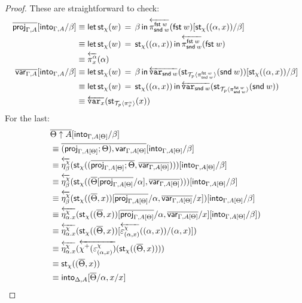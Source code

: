 \documentclass[10pt]{article}
\theoremstyle{definition}
\newcommand\dsd[1]{\ensuremath{\mathsf{#1}}}
\newcommand{\app}[2]{\ensuremath{#1 \: #2}}
\newcommand{\fst}[1]{\app{\dsd{fst}}{#1}}
\newcommand{\snd}[1]{\app{\dsd{snd}}{#1}}
\newcommand{\rewrite}[2]{\overleftarrow{#1}(#2)}
\newcommand\StI[2]{\ensuremath{\mathsf{st}_{#1}(#2)}}
\newcommand\StE[4]{\ensuremath{\mathsf{let} \, \StI{#1}{#3} \, = \, {#2} \, \mathsf{in} \, #4}}
\newcommand\TrPlus[2]{\ensuremath{{#1}^+(#2)}}
\newcommand\ApEl[2]{\mathcal{T}_{#1}\langle#2\rangle}
\begin{document}
\begin{proof}
These are straightforward to check:
\begin{align*}
\upstairs{\proj{\Gamma, A}}[\into{\Gamma, A}/\beta] 
&\equiv \StE{\chi}{\beta}{w}{\rewrite{\pi^{\fst w}_{\snd w}}{\fst w}}[\StI{\chi}{(\alpha, x)}/\beta] \\
&\equiv \StE{\chi}{\StI{\chi}{(\alpha, x)}}{w}{\rewrite{\pi^{\fst w}_{\snd w}}{\fst w}} \\
&\equiv \rewrite{\pi^\alpha_x}{\alpha} \\
\upstairs{\qvar{\Gamma, A}}[\into{\Gamma, A}/\beta]
&\equiv  \StE{\chi}{\beta}{w}{\rewrite{\var{\snd w}}{\StI{\ApEl{p}{\pi^{\fst w}_{\snd w}}}{\snd w}}}[\StI{\chi}{(\alpha, x)}/\beta]  \\
&\equiv \StE{\chi}{\StI{\chi}{(\alpha, x)}}{w}{\rewrite{\var{\snd w}}{\StI{\ApEl{p}{\pi^{\fst w}_{\snd w}}}{\snd w}}} \\
&\equiv \rewrite{\var{x}}{\StI{\ApEl{p}{\pi^{\alpha}_x}}{x}} \\
\end{align*}
For the last:
\begin{align*}
&\upstairs{\Theta \uparrow A}[\into{\Gamma, A[\Theta]}/\beta] \\
&\equiv \upstairs{(\proj{\Gamma, A[\Theta]}; \Theta) , \qvar{\Gamma, A[\Theta]}} [\into{\Gamma, A[\Theta]}/\beta] \\
&\equiv \rewrite{\eta^\chi_\beta}{\StI{\chi}{(\upstairs{\proj{\Gamma, A[\Theta]}; \Theta}, \upstairs{\qvar{\Gamma, A[\Theta]}})}}[\into{\Gamma, A[\Theta]}/\beta] \\
&\equiv \rewrite{\eta^\chi_\beta}{\StI{\chi}{(\upstairs{\Theta}[\upstairs{\proj{\Gamma, A[\Theta]}}/\alpha], \upstairs{\qvar{\Gamma, A[\Theta]}})}}[\into{\Gamma, A[\Theta]}/\beta] \\
&\equiv \rewrite{\eta^\chi_\beta}{\StI{\chi}{(\upstairs{\Theta}, x)}[\upstairs{\proj{\Gamma, A[\Theta]}}/\alpha, \upstairs{\qvar{\Gamma, A[\Theta]}}/x]}[\into{\Gamma, A[\Theta]}/\beta] \\
&\equiv \rewrite{\eta^\chi_{\alpha.x}}{\StI{\chi}{(\upstairs{\Theta}, x)}[\upstairs{\proj{\Gamma, A[\Theta]}}/\alpha, \upstairs{\qvar{\Gamma, A[\Theta]}}/x][\into{\Gamma, A[\Theta]}/\beta]} \\
&\equiv \rewrite{\eta^\chi_{\alpha.x}}{\StI{\chi}{(\upstairs{\Theta}, x)}[\rewrite{\varepsilon^\chi_{(\alpha,x)}}{(\alpha,x)}/(\alpha,x)]} \\
&\equiv \rewrite{\eta^\chi_{\alpha.x}}{\rewrite{\TrPlus{\chi}{\varepsilon^\chi_{(\alpha,x)}}}{\StI{\chi}{(\upstairs{\Theta}, x)}}} \\
&\equiv \StI{\chi}{(\upstairs{\Theta}, x)} \\
&\equiv \into{\Delta, A}[\upstairs{\Theta}/\alpha, x / x]
\end{align*}
\end{proof}
\end{document}
